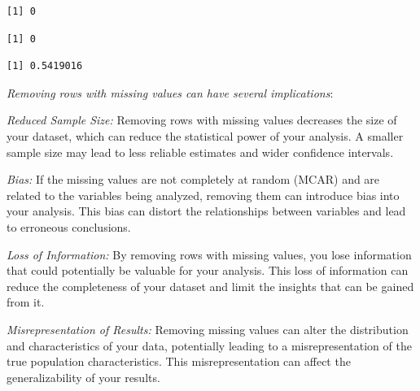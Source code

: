 \documentclass[
  letterpaper,
  DIV=11,
  numbers=noendperiod]{scrartcl}
\newenvironment{Shaded}{\begin{snugshade}}{\end{snugshade}}
\newcommand{\CommentTok}[1]{\textcolor[rgb]{0.37,0.37,0.37}{#1}}
\newcommand{\FunctionTok}[1]{\textcolor[rgb]{0.28,0.35,0.67}{#1}}
\newcommand{\NormalTok}[1]{\textcolor[rgb]{0.00,0.23,0.31}{#1}}
\newcommand{\OtherTok}[1]{\textcolor[rgb]{0.00,0.23,0.31}{#1}}
\newcommand{\SpecialCharTok}[1]{\textcolor[rgb]{0.37,0.37,0.37}{#1}}
\begin{document}
\begin{verbatim}
[1] 0
\end{verbatim}

\begin{Shaded}
\end{Shaded}

\begin{verbatim}
[1] 0
\end{verbatim}

\begin{Shaded}
\end{Shaded}

\begin{verbatim}
[1] 0.5419016
\end{verbatim}

\emph{Removing rows with missing values can have several implications}:

\emph{Reduced Sample Size:} Removing rows with missing values decreases
the size of your dataset, which can reduce the statistical power of your
analysis. A smaller sample size may lead to less reliable estimates and
wider confidence intervals.

\emph{Bias:} If the missing values are not completely at random (MCAR)
and are related to the variables being analyzed, removing them can
introduce bias into your analysis. This bias can distort the
relationships between variables and lead to erroneous conclusions.

\emph{Loss of Information:} By removing rows with missing values, you
lose information that could potentially be valuable for your analysis.
This loss of information can reduce the completeness of your dataset and
limit the insights that can be gained from it.

\emph{Misrepresentation of Results:} Removing missing values can alter
the distribution and characteristics of your data, potentially leading
to a misrepresentation of the true population characteristics. This
misrepresentation can affect the generalizability of your results.
\end{document}
